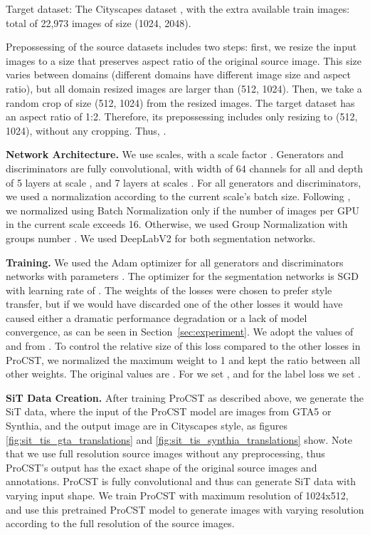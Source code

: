 \documentclass[letterpaper]{article} \usepackage[]{aaai23}  \usepackage{times}  \usepackage{helvet}  \usepackage{courier}  \usepackage[hyphens]{url}  \usepackage{graphicx} \urlstyle{rm} \def\UrlFont{\rm}  \usepackage{natbib}  \usepackage{caption} \frenchspacing  \setlength{\pdfpagewidth}{8.5in} \setlength{\pdfpageheight}{11in} \usepackage{algorithm}
\begin{document}
Target dataset: The Cityscapes dataset \cite{cityscapes}, with the extra available train images: total of 22,973 images of size (1024, 2048). 

Prepossessing of the source datasets includes two steps: first, we resize the input images to a size that preserves aspect ratio of the original source image. This size varies between domains (different domains have different image size and aspect ratio), but all domain resized images are larger than (512, 1024). Then, we take a random crop of size (512, 1024) from the resized images. The target dataset has an aspect ratio of 1:2. Therefore, its prepossessing includes only resizing to (512, 1024), without any cropping. Thus, .

\textbf{Network Architecture.}
We use  scales, with a scale factor . Generators and discriminators are fully convolutional, with width of 64 channels for all  and depth of 5 layers at scale , and 7 layers at scales . For all generators and discriminators, we used a normalization according to the current scale's batch size. Following \citet{wu2018group}, we normalized using Batch Normalization only  if the number of images per GPU in the current scale exceeds 16. Otherwise, we used Group Normalization with groups number .
We used DeepLabV2 \cite{chen2017deeplab} for both segmentation networks.


\textbf{Training.} 
We used the Adam optimizer for all generators and discriminators networks with parameters . The optimizer for the segmentation networks is SGD with learning rate of .
The weights of the losses were chosen to prefer style transfer, but if we would have discarded one of the other losses it would have caused either a dramatic performance degradation or a lack of model convergence, as can be seen in Section~\ref{sec:experiment}.
We adopt the values of  and  from \citet{johnson2016perceptual}. To control the relative size of this loss compared to the other losses in ProCST, we normalized the maximum weight to 1 and kept the ratio between all other weights. The original values are .
For  we set , and for the label loss we set .


\textbf{SiT Data Creation.} After training ProCST as described above, we generate the SiT data, where the input of the ProCST model are images from GTA5 or Synthia, and the output image are in Cityscapes style, as figures \ref{fig:sit_tis_gta_translations} and \ref{fig:sit_tis_synthia_translations} show. Note that we use full resolution source images without any preprocessing, thus ProCST's output has the exact shape of the original source images and annotations. ProCST is fully convolutional and thus can generate SiT data with varying input shape. We train ProCST with maximum resolution of 1024x512, and use this pretrained ProCST model to generate images with varying resolution according to the full resolution of the source images. 
\end{document}
